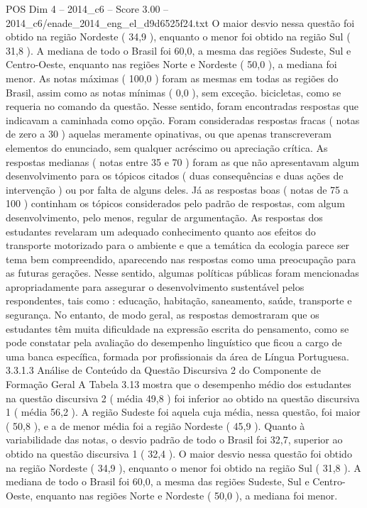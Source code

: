 \begin{textsample}{POS Dim 4 – 2014\_c6 – Score 3.00 – 2014\_c6/enade\_2014\_eng\_el\_d9d6525f24.txt}
O maior desvio nessa questão foi obtido na região Nordeste ( 34,9 ), enquanto o menor foi obtido na região Sul ( 31,8 ).
A mediana de todo o Brasil foi 60,0, a mesma das regiões Sudeste, Sul e Centro-Oeste, enquanto nas regiões Norte e Nordeste ( 50,0 ), a mediana foi menor.
As notas máximas ( 100,0 ) foram as mesmas em todas as regiões do Brasil, assim como as notas mínimas ( 0,0 ), sem exceção. bicicletas, como se requeria no comando da questão.
Nesse sentido, foram encontradas respostas que indicavam a caminhada como opção.
Foram consideradas respostas fracas ( notas de zero a 30 ) aquelas meramente opinativas, ou que apenas transcreveram elementos do enunciado, sem qualquer acréscimo ou apreciação crítica.
As respostas medianas ( notas entre 35 e 70 ) foram as que não apresentavam algum desenvolvimento para os tópicos citados ( duas consequências e duas ações de intervenção ) ou por falta de alguns deles.
Já as respostas boas ( notas de 75 a 100 ) continham os tópicos considerados pelo padrão de respostas, com algum desenvolvimento, pelo menos, regular de argumentação.
As respostas dos estudantes revelaram um adequado conhecimento quanto aos efeitos do transporte motorizado para o ambiente e que a temática da ecologia parece ser tema bem compreendido, aparecendo nas respostas como uma preocupação para as futuras gerações.
Nesse sentido, algumas políticas públicas foram mencionadas apropriadamente para assegurar o desenvolvimento sustentável pelos respondentes, tais como : educação, habitação, saneamento, saúde, transporte e segurança.
No entanto, de modo geral, as respostas demostraram que os estudantes têm muita dificuldade na expressão escrita do pensamento, como se pode constatar pela avaliação do desempenho linguístico que ficou a cargo de uma banca específica, formada por profissionais da área de Língua Portuguesa. 3.3.1.3 Análise de Conteúdo da Questão Discursiva 2 do Componente de Formação Geral A Tabela 3.13 mostra que o desempenho médio dos estudantes na questão discursiva 2 ( média 49,8 ) foi inferior ao obtido na questão discursiva 1 ( média 56,2 ).
A região Sudeste foi aquela cuja média, nessa questão, foi maior ( 50,8 ), e a de menor média foi a região Nordeste ( 45,9 ).
Quanto à variabilidade das notas, o desvio padrão de todo o Brasil foi 32,7, superior ao obtido na questão discursiva 1 ( 32,4 ).
O maior desvio nessa questão foi obtido na região Nordeste ( 34,9 ), enquanto o menor foi obtido na região Sul ( 31,8 ).
A mediana de todo o Brasil foi 60,0, a mesma das regiões Sudeste, Sul e Centro-Oeste, enquanto nas regiões Norte e Nordeste ( 50,0 ), a mediana foi menor.

\end{textsample}
